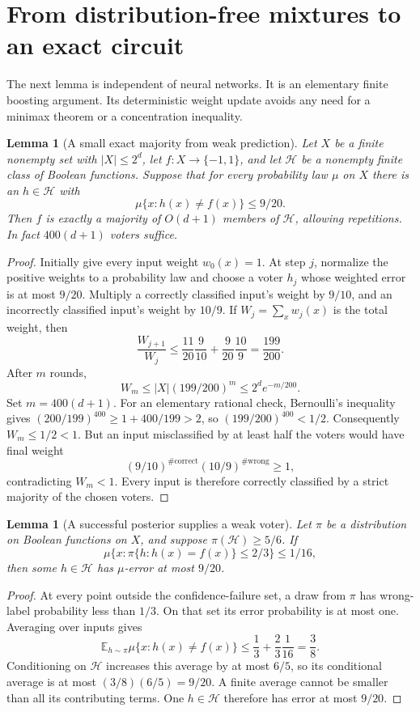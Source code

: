 \documentclass[11pt]{article}
\newtheorem{lemma}[theorem]{Lemma}
\theoremstyle{remark}\newtheorem{remark}[theorem]{Remark}
\newcommand{\E}{\mathbb E}
\begin{document}
\section{From distribution-free mixtures to an exact circuit}
\label{sec:majorities}

The next lemma is independent of neural networks. It is an elementary
finite boosting argument. Its deterministic weight update avoids any
need for a minimax theorem or a concentration inequality.

\begin{lemma}[A small exact majority from weak prediction]
\label{lem:majority}
Let $X$ be a finite nonempty set with $|X|\le2^d$, let
$f:X\to\{-1,1\}$, and let $\mathcal H$ be a nonempty finite class of
Boolean functions. Suppose that for every probability law $\mu$ on $X$
there is an $h\in\mathcal H$ with
\[
 \mu\{x:h(x)\ne f(x)\}\le9/20.
\]
Then $f$ is exactly a majority of $O(d+1)$ members of $\mathcal H$,
allowing repetitions. In fact $400(d+1)$ voters suffice.
\end{lemma}
\begin{proof}
Initially give every input weight $w_0(x)=1$. At step $j$, normalize the
positive weights to a probability law and choose a voter $h_j$ whose
weighted error is at most $9/20$. Multiply a correctly classified input's
weight by $9/10$, and an incorrectly classified input's weight by $10/9$.
If $W_j=\sum_x w_j(x)$ is the total weight, then
\[
 \frac{W_{j+1}}{W_j}
 \le\frac{11}{20}\frac9{10}+\frac9{20}\frac{10}{9}
 =\frac{199}{200}.
\]
After $m$ rounds,
\begin{equation}\label{eq:boost-potential}
 W_m\le |X|(199/200)^m\le2^d e^{-m/200}.
\end{equation}
Set $m=400(d+1)$. For an elementary rational check, Bernoulli's inequality
gives $(200/199)^{400}\ge1+400/199>2$, so
$(199/200)^{400}<1/2$. Consequently $W_m\le1/2<1$.
But an input misclassified by at least half the voters would have final
weight
\[
 (9/10)^{\#\mathrm{correct}}(10/9)^{\#\mathrm{wrong}}\ge1,
\]
contradicting $W_m<1$. Every input is therefore correctly classified
by a strict majority of the chosen voters.
\end{proof}

\begin{lemma}[A successful posterior supplies a weak voter]
\label{lem:posterior-voter}
Let $\pi$ be a distribution on Boolean functions on $X$, and suppose
$\pi(\mathcal H)\ge5/6$. If
\[
 \mu\{x:\pi\{h:h(x)=f(x)\}\le2/3\}\le1/16,
\]
then some $h\in\mathcal H$ has $\mu$-error at most $9/20$.
\end{lemma}
\begin{proof}
At every point outside the confidence-failure set, a draw from $\pi$
has wrong-label probability less than $1/3$. On that set its error
probability is at most one. Averaging over inputs gives
\[
 \E_{h\sim\pi}\mu\{x:h(x)\ne f(x)\}
 \le\frac13+\frac23\frac1{16}=\frac38.
\]
Conditioning on $\mathcal H$ increases this average by at most $6/5$,
so its conditional average is at most $(3/8)(6/5)=9/20$. A finite
average cannot be smaller than all its contributing terms. One
$h\in\mathcal H$ therefore has error at most $9/20$.
\end{proof}
\end{document}
